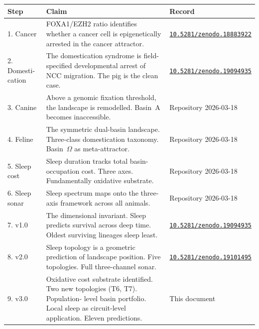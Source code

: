 \documentclass[10pt, a4paper]{article}
\begin{document}
\begin{center}
\small
\begin{tabular}{p{1.3cm}p{5.5cm}p{5.5cm}}
\toprule
\textbf{Step} &
\textbf{Claim} &
\textbf{Record}\\
\midrule
1. Cancer &
FOXA1/EZH2 ratio identifies whether
a cancer cell is epigenetically arrested
in the cancer attractor. &
\href{https://doi.org/10.5281/zenodo.18883922}
{\texttt{10.5281/zenodo.18883922}}\\[0.4em]
2. Domesti-\-cation &
The domestication syndrome is
field-specified developmental arrest
of NCC migration. The pig is the
clean case. &
\href{https://doi.org/10.5281/zenodo.19094935}
{\texttt{10.5281/zenodo.19094935}}\\[0.4em]
3. Canine &
Above a genomic fixation threshold,
the landscape is remodelled. Basin~A
becomes inaccessible. &
Repository 2026-03-18\\[0.4em]
4. Feline &
The symmetric dual-basin landscape.
Three-class domestication taxonomy.
Basin~$\Omega$ as meta-attractor. &
Repository 2026-03-18\\[0.4em]
5. Sleep cost &
Sleep duration tracks total basin-
occupation cost. Three axes.
Fundamentally oxidative substrate. &
Repository 2026-03-18\\[0.4em]
6. Sleep sonar &
Sleep spectrum maps onto the
three-axis framework across all animals. &
Repository 2026-03-18\\[0.4em]
7. v1.0 &
The dimensional invariant. Sleep
predicts survival across deep time.
Oldest surviving lineages sleep least. &
\href{https://doi.org/10.5281/zenodo.19094935}
{\texttt{10.5281/zenodo.19094935}}\\[0.4em]
8. v2.0 &
Sleep topology is a geometric prediction
of landscape position. Five topologies.
Full three-channel sonar. &
\href{https://doi.org/10.5281/zenodo.19101495}
{\texttt{10.5281/zenodo.19101495}}\\[0.4em]
9. v3.0 &
Oxidative cost substrate identified.
Two new topologies (T6, T7). Population-
level basin portfolio. Local sleep as
circuit-level application. Eleven
predictions. &
This document\\
\bottomrule
\end{tabular}
\end{center}

\bigskip
\end{document}
